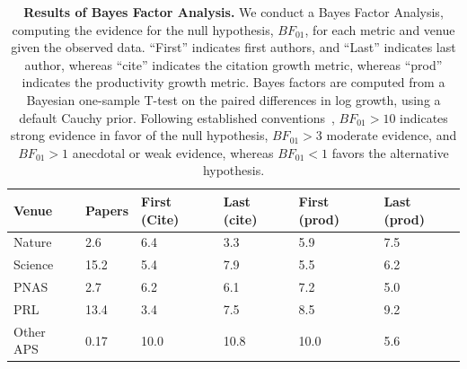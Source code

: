 \documentclass[12pt]{article} %
\begin{document}
\begin{table}[ht]
\centering
\caption{
\textbf{Results of Bayes Factor Analysis.}
We conduct a Bayes Factor Analysis, computing the evidence for the null hypothesis, $BF_{01}$, for each metric and venue given the observed data. 
``First'' indicates first authors, and ``Last'' indicates last author, whereas ``cite'' indicates the citation growth metric, whereas ``prod'' indicates the productivity growth metric.
Bayes factors are computed from a Bayesian one-sample T-test on the paired differences in log growth, using a default Cauchy prior.
Following established conventions~\cite{jeffreys1961theory}, $BF_{01} > 10$ indicates strong evidence in favor of the null hypothesis, $BF_{01} > 3$ moderate evidence, and $BF_{01} > 1$ anecdotal or weak evidence, whereas $BF_{01} < 1$ favors the alternative hypothesis.
}
\label{si:tab:bayes-factor}
\begin{tabular}{llllll}
\toprule
Venue & Papers & First (Cite) & Last (cite) & First (prod) & Last (prod) \\
\midrule
Nature    & 2.6  & 6.4  & 3.3  & 5.9  & 7.5 \\
Science   & 15.2 & 5.4  & 7.9  & 5.5  & 6.2 \\
PNAS      & 2.7  & 6.2  & 6.1  & 7.2  & 5.0 \\
PRL       & 13.4 & 3.4  & 7.5  & 8.5  & 9.2 \\
Other APS & 0.17 & 10.0 & 10.8 & 10.0 & 5.6 \\
\bottomrule
\end{tabular}
\end{table}

\clearpage
\printbibliography{}
\end{document}
